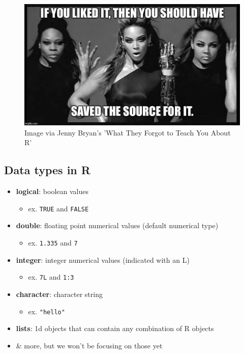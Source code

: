 \documentclass[
]{book}
\providecommand{\tightlist}{%
  \setlength{\itemsep}{0pt}\setlength{\parskip}{0pt}}
\begin{document}
\begin{figure}
\includegraphics[width=12.33in]{img/if-you-liked-it-you-should-have-saved-the-source-for-it} \caption{ Image via Jenny Bryan's 'What They Forgot to Teach You About R'}\label{fig:unnamed-chunk-9}
\end{figure}

\hypertarget{data-types-in-r}{%
\subsection*{Data types in R}\label{data-types-in-r}}

\begin{itemize}
\tightlist
\item
  \textbf{logical}: boolean values

  \begin{itemize}
  \tightlist
  \item
    ex. \texttt{TRUE} and \texttt{FALSE}
  \end{itemize}
\item
  \textbf{double}: floating point numerical values (default numerical type)

  \begin{itemize}
  \tightlist
  \item
    ex. \texttt{1.335} and \texttt{7}
  \end{itemize}
\item
  \textbf{integer}: integer numerical values (indicated with an L)

  \begin{itemize}
  \tightlist
  \item
    ex. \texttt{7L} and \texttt{1:3}
  \end{itemize}
\item
  \textbf{character}: character string

  \begin{itemize}
  \tightlist
  \item
    ex. \texttt{"hello"}\\
  \end{itemize}
\item
  \textbf{lists}: 1d objects that can contain any combination of R objects
\item
  \& more, but we won't be focusing on those yet
\end{itemize}
\end{document}

